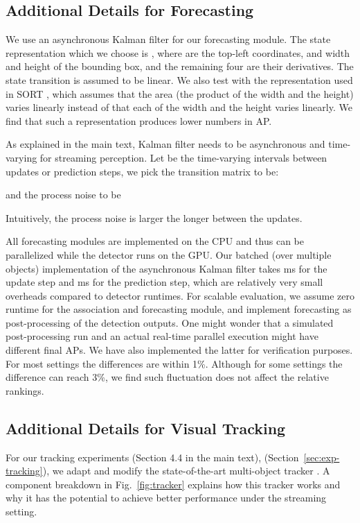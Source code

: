 \subsection{Additional Details for Forecasting}
\label{app:forecasting}

We use an asynchronous Kalman filter for our forecasting module. The state representation which we choose is , where  are the top-left coordinates, and width and height of the bounding box, and the remaining four are their derivatives. The state transition is assumed to be linear. We also test with the representation used in SORT \cite{Bewley2016_sort}, which assumes that the area (the product of the width and the height) varies linearly instead of that each of the width and the height varies linearly. We find that such a representation produces lower numbers in AP.

As explained in the main text, Kalman filter needs to be asynchronous and time-varying for streaming perception.
Let  be the time-varying intervals between updates or prediction steps, we pick the transition matrix to be:

and the process noise to be

Intuitively, the process noise is larger the longer between the updates.

All forecasting modules are implemented on the CPU and thus can be parallelized while the detector runs on the GPU. Our batched (over multiple objects) implementation of the asynchronous Kalman filter takes ms for the update step and ms for the prediction step, which are relatively very small overheads compared to detector runtimes. For scalable evaluation, we assume zero runtime for the association and forecasting module, and implement forecasting as post-processing of the detection outputs. One might wonder that a simulated post-processing run and an actual real-time parallel execution might have different final APs. We have also implemented the latter for verification purposes. For most settings the differences are within 1\%. Although for some settings the difference can reach 3\%, we find such fluctuation does not affect the relative rankings.


\subsection{Additional Details for Visual Tracking}
\label{app:tracking}

For our tracking experiments
\ifstandalonesupplement
    (Section 4.4 in the main text),
\else
    (Section~\ref{sec:exp-tracking}),
\fi
we adapt and modify the state-of-the-art multi-object tracker \cite{Bergmann2019TrackingWB}. A component breakdown in Fig.~\ref{fig:tracker} explains how this tracker works and why it has the potential to achieve better performance under the streaming setting.

